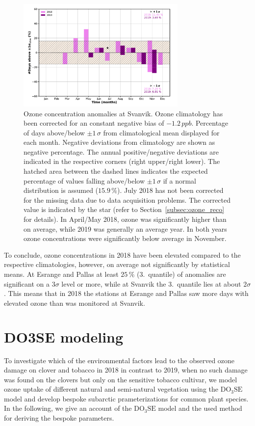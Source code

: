 \documentclass[bg, manuscript]{copernicus}
\begin{document}
\begin{figure}[t]
  \includegraphics[width=8.3cm]{fig11}
  \caption{Ozone concentration anomalies at Svanvik. Ozone climatology has been corrected for an constant negative bias of $-1.2\,\unit{ppb}$. Percentage of days above/below $\pm 1\,\sigma$ from climatological mean displayed for each month. Negative deviations from climatology are shown as negative percentage. The annual positive/negative deviations are indicated in the respective corners (right upper/right lower). The hatched area between the dashed lines indicates the expected percentage of values falling above/below $\pm 1\,\sigma$ if a normal distribution is assumed ($15.9\,\unit{\%}$). July 2018 has not been corrected for the missing data due to data acquisition problems. The corrected value is indicated by the star (refer to Section~\ref{subsec:ozone_reco} for details). In April/May 2018, ozone was significantly higher than on average, while 2019 was generally an average year. In both years ozone concentrations were significantly below average in November.}
  \label{fig:ozone_signific}
\end{figure}

To conclude, ozone concentrations in 2018 have been elevated compared to the respective climatologies, however, on average not significantly by statistical means. At Esrange and Pallas at least $25\,\unit{\%}$ (3.~quantile) of anomalies are significant on a $3\sigma$ level or more, while at Svanvik the 3.~quantile lies at about $2\sigma$. This means that in 2018 the stations at Esrange and Pallas saw more days with elevated ozone than was monitored at Svanvik.

\section{DO3SE modeling}
\label{sec:do3se}
To investigate which of the environmental factors lead to the observed ozone damage on clover and tobacco in 2018 in contrast to 2019, when no such damage was found on the clovers but only on the sensitive tobacco cultivar, we model ozone uptake of different natural and semi-natural vegetation using the $\mathrm{DO_3SE}$ model and develop bespoke subarctic prameterizations for common plant species. In the following, we give an account of the $\mathrm{DO_3SE}$ model and the used method for deriving the bespoke parameters.
\end{document}
